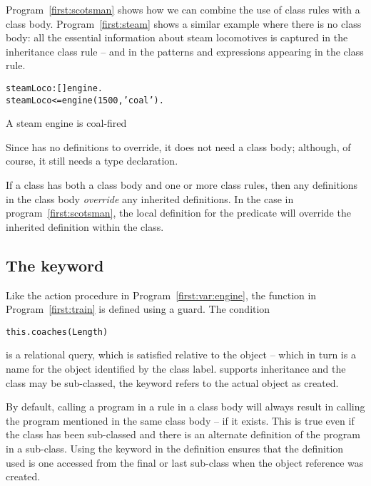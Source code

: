Program~\vref{first:scotsman} shows how we can combine the use of class rules with a class body. Program~\vref{first:steam} shows a similar example where there is no class body: all the essential information about steam locomotives is captured in the inheritance class rule -- and in the patterns and expressions appearing in the class rule.
\begin{program}
\vspace{0.5ex}
\begin{alltt}
steamLoco:[]\conarrow{}engine.
steamLoco <= engine(1500,'coal').
\end{alltt}
\vspace{-2ex}
\caption{A steam engine is coal-fired\label{first:steam}}
\end{program}
Since  has no definitions to override, it does not need a class body; although, of course, it still needs a type declaration.

If a class has both a class body and one or more class rules, then any definitions in the class body \emph{override} any inherited definitions. In the  case in program~\vref{first:scotsman}, the local definition for the  predicate will override the inherited definition within the  class.

\subsection{The  keyword}
Like the  action procedure in Program~\vref{first:var:engine}, the  function in Program~\vref{first:train} is defined using a guard. The condition 
\begin{alltt}
this.coaches(Length)
\end{alltt}
is a relational query, which is satisfied relative to the  object -- which in turn is a name for the object identified by the  class label. \go supports inheritance and the  class may be sub-classed, the  keyword refers to the actual object as created. 

By default, calling a program in a rule in a class body will always result in calling the program mentioned in the same class body -- if it exists. This is true even if the class has been sub-classed and there is an alternate definition of the program in a sub-class. Using the  keyword in the  definition ensures that the definition used is one accessed from the final or last sub-class when the object reference was created.

